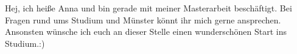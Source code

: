 \begin{multicols}{2}
{
Hej, ich heiße Anna und bin gerade mit meiner Masterarbeit beschäftigt. 
Bei Fragen rund ums Studium und Münster könnt ihr mich gerne ansprechen. 
Ansonsten wünsche ich euch an dieser Stelle einen wunderschönen Start ins Studium.:)
}

\vspace{-0.8cm}


\end{multicols}
